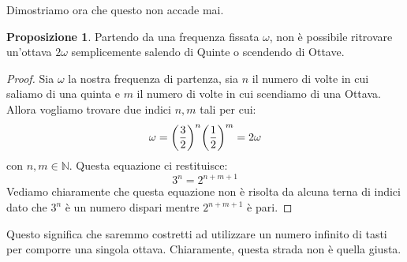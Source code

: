 \documentclass[12pt,a4paper]{report}
\theoremstyle{definition}
\theoremstyle{Theorem}
\newtheorem{Prop}[Def]{Proposizione}
\theoremstyle{definition}
\theoremstyle{definition}
\theoremstyle{definition}
\begin{document}
	Dimostriamo ora che questo non accade mai.
	\\
	 \begin{Prop}
	 	Partendo da una frequenza fissata $\omega$, non è possibile ritrovare un'ottava $2\omega$ semplicemente salendo di Quinte o scendendo di Ottave.
	 \end{Prop}
	 \begin{proof}
	 	Sia $\omega$ la nostra frequenza di partenza, sia $n$ il numero di volte in cui saliamo di una quinta e $m$ il numero di volte in cui scendiamo di una Ottava. Allora vogliamo trovare due indici $n,m$ tali per cui:
	 	$$\omega=\bigg({3\over 2}\bigg)^n\bigg({1\over 2}\bigg)^m=2\omega$$
	 	con $n,m\in \mathbb{N}$. Questa equazione ci restituisce:
	 	$$3^n=2^{n+m+1}$$
	 	Vediamo chiaramente che questa equazione non è risolta da alcuna terna di indici dato che $3^n$ è un numero dispari mentre $2^{n+m+1}$ è pari.
	 \end{proof}
	 Questo significa che saremmo costretti ad utilizzare un numero infinito di tasti per comporre una singola ottava. Chiaramente, questa strada non è quella giusta.
\end{document}
